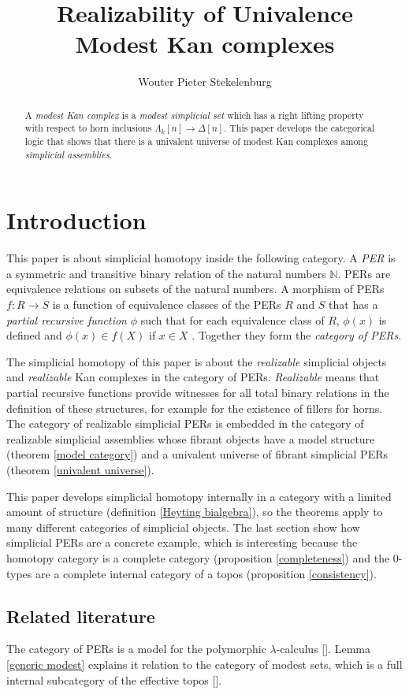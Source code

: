 \documentclass{tac}
\title{Realizability of Univalence\\Modest Kan complexes}
\author{Wouter Pieter Stekelenburg}\copyrightyear{2015}
\newcommand\N{\mathbb N}
\newcommand\of{:}
\newcommand\simplex\Delta
\newcommand\horn\Lambda
\newcommand\citep[1]{[\cite{#1}]}
\begin{document}
\begin{abstract}
A \emph{modest Kan complex} is a \emph{modest simplicial set} which has a right lifting property with respect to horn inclusions $\horn_k[n] \to \simplex[n]$. This paper develops the categorical logic that shows that there is a univalent universe of modest Kan complexes among \emph{simplicial assemblies}.
\end{abstract}

\maketitle


\section{Introduction}
This paper is about simplicial homotopy inside the following category. A \emph{PER} is a symmetric and transitive binary relation of the natural numbers $\N$. PERs are equivalence relations on subsets of the natural numbers. A morphism of PERs $f\of R\to S$ is a function of equivalence classes of the PERs $R$ and $S$ that has a \emph{partial recursive function} $\phi$ such that for each equivalence class of $R$, $\phi(x)$ is defined and $\phi(x)\in f(X)$ if $x\in X$ . Together they form the \emph{category of PERs}. 

The simplicial homotopy of this paper is about the \emph{realizable} simplicial objects and \emph{realizable} Kan complexes in the category of PERs. \emph{Realizable} means that partial recursive functions provide witnesses for all total binary relations in the definition of these structures, for example for the existence of fillers for horns. The category of realizable simplicial PERs is embedded in the category of realizable simplicial assemblies whose fibrant objects have a model structure (theorem \ref{model category}) and a univalent universe of fibrant simplicial PERs (theorem \ref{univalent universe}).

This paper develops simplicial homotopy internally in a category with a limited amount of structure (definition \ref{Heyting bialgebra}), so the theorems apply to many different categories of simplicial objects. The last section show how simplicial PERs are a concrete example, which is interesting because the homotopy category is a complete category (proposition \ref{completeness}) and the 0-types are a complete internal category of a topos (proposition \ref{consistency}).

\subsection{Related literature}
The category of PERs is a model for the polymorphic $\lambda$-calculus \citep{MR1099188,MR2074932,MR1003196}. Lemma \ref{generic modest} explains it relation to the category of modest sets, which is a full internal subcategory of the effective topos \citep{MR1097022,MR1023803,MR2479466}.
\end{document}

